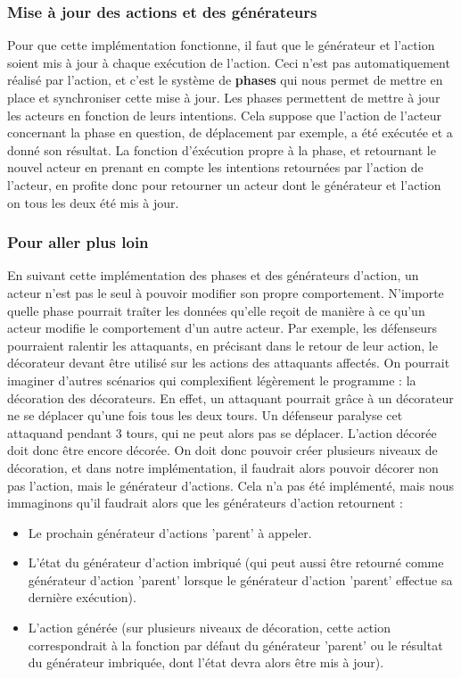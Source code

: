 \documentclass{article}
\begin{document}
\subsubsection{Mise à jour des actions et des générateurs}

Pour que cette implémentation fonctionne, il faut que le générateur et l'action soient mis à jour à chaque exécution de l'action. Ceci n'est pas automatiquement réalisé par l'action, et c'est le système de \textbf{phases} qui nous permet de mettre en place et synchroniser cette mise à jour.
Les phases permettent de mettre à jour les acteurs en fonction de leurs intentions. Cela suppose que l'action de l'acteur concernant la phase en question, de déplacement par exemple, a été exécutée et a donné son résultat. La fonction d'éxécution propre à la phase, et retournant le nouvel acteur en prenant en compte les intentions retournées par l'action de l'acteur, en profite donc pour retourner un acteur dont le générateur et l'action on tous les deux été mis à jour.

\subsubsection{Pour aller plus loin}

En suivant cette implémentation des phases et des générateurs d'action, un acteur n'est pas le seul à pouvoir modifier son propre comportement. N'importe quelle phase pourrait traîter les données qu'elle reçoit de manière à ce qu'un acteur modifie le comportement d'un autre acteur. Par exemple, les défenseurs pourraient ralentir les attaquants, en précisant dans le retour de leur action, le décorateur devant être utilisé sur les actions des attaquants affectés.
On pourrait imaginer d'autres scénarios qui complexifient légèrement le programme : la décoration des décorateurs. En effet, un attaquant pourrait grâce à un décorateur ne se déplacer qu'une fois tous les deux tours. Un défenseur paralyse cet attaquand pendant 3 tours, qui ne peut alors pas se déplacer. L'action décorée doit donc être encore décorée. On doit donc pouvoir créer plusieurs niveaux de décoration, et dans notre implémentation, il faudrait alors pouvoir décorer non pas l'action, mais le générateur d'actions. Cela n'a pas été implémenté, mais nous immaginons qu'il faudrait alors que les générateurs d'action retournent :
\begin{itemize}
    \item Le prochain générateur d'actions 'parent' à appeler.
    \item L'état du générateur d'action imbriqué (qui peut aussi être retourné comme générateur d'action 'parent' lorsque le générateur d'action 'parent' effectue sa dernière exécution).
    \item L'action générée (sur plusieurs niveaux de décoration, cette action correspondrait à la fonction par défaut du générateur 'parent' ou le résultat du générateur imbriquée, dont l'état devra alors être mis à jour).
\end{itemize}
\end{document}
